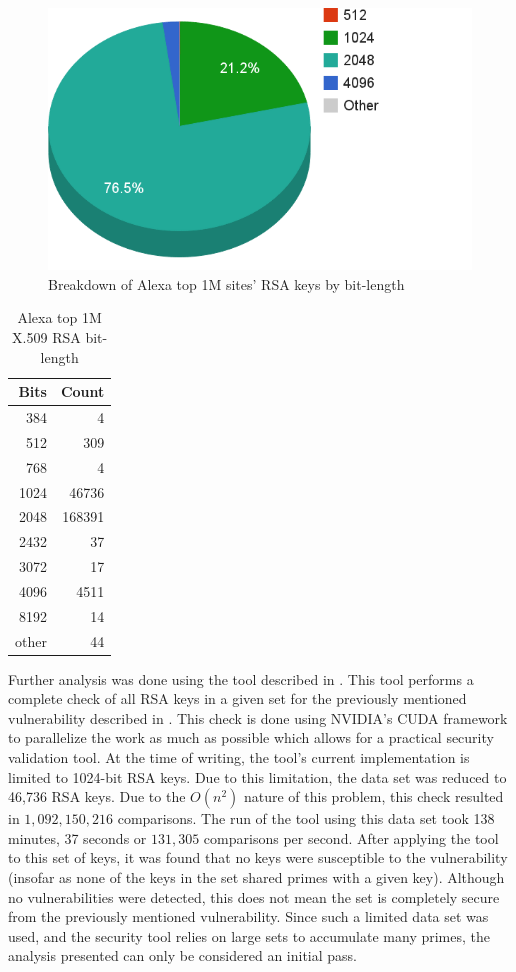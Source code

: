 \documentclass[12pt]{ucthesis}
\begin{document}
\begin{figure}
   \centering
   \includegraphics[width=0.75\linewidth]{bit_length.png}
   \caption{Breakdown of Alexa top 1M sites' RSA keys by bit-length}
   \label{fig:bits}
\end{figure}

\begin{table}
\centering
\caption{Alexa top 1M X.509 RSA bit-length}
\begin{tabular}{|r|r|}\hline
\textbf{Bits} & \textbf{Count}\\\hline
384 & 4 \\ \hline
512 & 309 \\ \hline
768 & 4 \\ \hline
1024 & 46736 \\ \hline
2048 & 168391 \\ \hline
2432 & 37 \\ \hline
3072 & 17 \\ \hline
4096 & 4511 \\ \hline
8192 & 14 \\ \hline
other & 44 \\ \hline
\end{tabular}
\label{tab:bits}
\end{table}

Further analysis was done using the tool described in
\cite{scharfglass2012breaking}. This tool performs a complete check of all
RSA keys in a given set for the previously mentioned vulnerability described
in \cite{lenstra2012ron}. This check is done using NVIDIA's CUDA framework to
parallelize the work as much as possible which allows for a practical security
validation tool. At the time of writing, the tool's current implementation is
limited to 1024-bit RSA keys. Due to this limitation, the data set was
reduced to 46,736 RSA keys. Due to the $O(n^2)$ nature of this problem,
this check resulted in $1,092,150,216$ comparisons. The run of the tool using
this data set took 138 minutes, 37 seconds or $131,305$ comparisons per second.
After applying the tool to this set of keys, it was found that no keys were
susceptible to the vulnerability (insofar as none of the keys in the set
shared primes with a given key). Although no vulnerabilities were detected,
this does not mean the set is completely secure from the previously mentioned
vulnerability. Since such a limited data set was used, and the security tool
relies on large sets to accumulate many primes, the analysis presented can
only be considered an initial pass.
\end{document}
